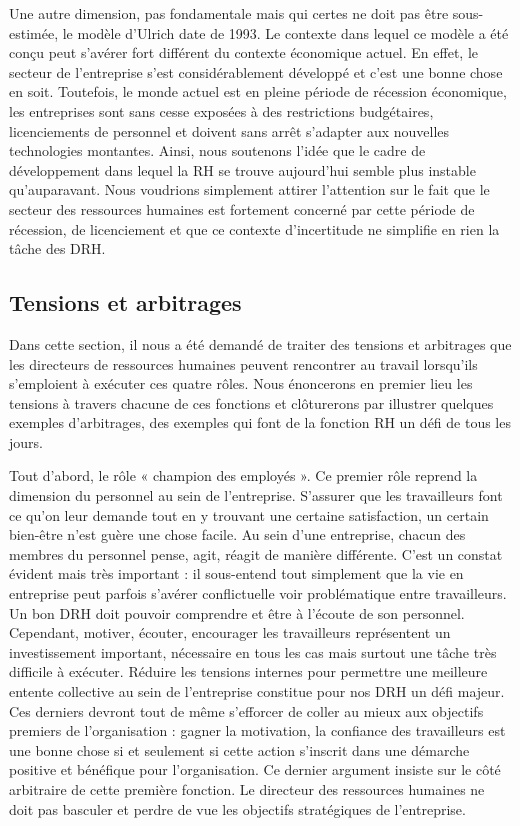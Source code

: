 \documentclass[a4paper, 12pt]{article}
\begin{document}
Une autre dimension, pas fondamentale mais qui certes ne doit pas être sous-estimée, le modèle d'Ulrich date de 1993. Le contexte dans lequel ce modèle a été conçu peut s'avérer fort différent du contexte économique actuel. En effet, le secteur de l'entreprise s'est considérablement développé et c'est une bonne chose en soit. Toutefois, le monde actuel est en pleine période de récession économique, les entreprises sont sans cesse exposées à des restrictions budgétaires, licenciements de personnel et doivent sans arrêt s'adapter aux nouvelles technologies montantes. Ainsi, nous soutenons l'idée que le cadre de développement dans lequel la RH se trouve aujourd'hui semble plus instable qu'auparavant. Nous voudrions simplement attirer l'attention sur le fait que le secteur des ressources humaines est fortement concerné par cette période de récession, de licenciement et que ce contexte d'incertitude ne simplifie en rien la tâche des DRH.

\subsection{Tensions et arbitrages}

Dans cette section, il nous a été demandé de traiter des tensions et arbitrages que les directeurs de ressources humaines peuvent rencontrer au travail lorsqu'ils s'emploient à exécuter ces quatre rôles. Nous énoncerons en premier lieu les tensions à travers chacune de ces fonctions et clôturerons par illustrer quelques exemples d'arbitrages, des exemples qui font de la fonction RH un défi de tous les jours.

Tout d'abord, le rôle « champion des employés ». Ce premier rôle reprend la dimension du personnel au sein de l'entreprise. S'assurer que les travailleurs font ce qu'on leur demande tout en y trouvant une certaine satisfaction, un certain bien-être n'est guère une chose facile. Au sein d'une entreprise, chacun des membres du personnel pense, agit, réagit de manière différente. C'est un constat évident mais très important : il sous-entend tout simplement que la vie en entreprise peut parfois s'avérer conflictuelle voir problématique entre travailleurs. Un bon DRH doit pouvoir comprendre et être à l'écoute de son personnel. Cependant, motiver, écouter, encourager les travailleurs représentent un investissement important, nécessaire en tous les cas mais surtout une tâche très difficile à exécuter. Réduire les tensions internes pour permettre une meilleure entente collective au sein de l'entreprise constitue pour nos DRH un défi majeur. Ces derniers devront tout de même s'efforcer de coller au mieux aux objectifs premiers de l'organisation : gagner la motivation, la confiance des travailleurs est une bonne chose si et seulement si cette action s'inscrit dans une démarche positive et bénéfique pour l'organisation. Ce dernier argument insiste sur le côté arbitraire de cette première fonction. Le directeur des ressources humaines ne doit pas basculer et perdre de vue les objectifs stratégiques de l'entreprise.
\end{document}
